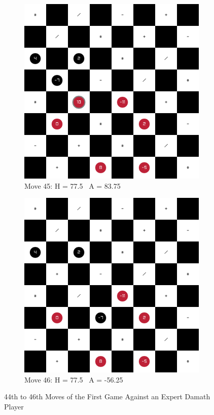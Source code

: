 \begin{figure}[H]
\begin{subfigure}{0.3\textwidth}
        \includegraphics[width=\textwidth]{images/games/game1/move_46.png}
        \caption*{Move 45: H = 77.5 \textbar\ A = 83.75}
    \end{subfigure}
    \quad
    \begin{subfigure}{0.3\textwidth}
        \centering
        \includegraphics[width=\textwidth]{images/games/game1/move_47.png}
        \caption*{Move 46: H = 77.5 \textbar\ A = -56.25}
    \end{subfigure}
    \caption{44th to 46th Moves of the First Game Against an Expert Damath Player}
    \label{fig:44-46-game1}
\end{figure}

